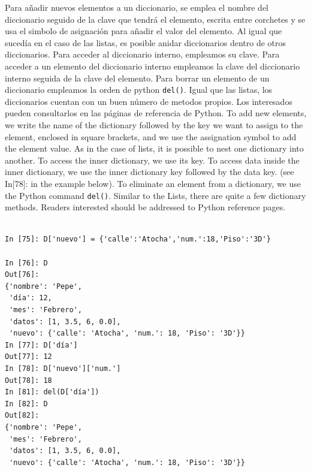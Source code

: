 \begin{paracol}{2}
Para añadir nuevos elementos a un diccionario, se emplea el nombre del diccionario seguido de la clave que tendrá el elemento, escrita entre corchetes y se usa el simbolo de asignación para añadir el valor del elemento. Al igual que sucedía en el caso de las listas, es posible anidar diccionarios dentro de otros diccionarios. Para acceder al diccionario interno, empleamos su clave. Para acceder a un elemento del diccionario interno empleamos la clave del diccionario interno seguida de la clave del elemento. Para borrar un elemento de un diccionario empleamos la orden de python \texttt{del()}. Igual que las listas, los diccionarios cuentan con un buen número de metodos propios. Los interesados pueden consultarlos en las páginas de referencia de Python.
\switchcolumn
To add new elements, we write the name of the dictionary followed by the key we want to assign to the element, enclosed in square brackets, and we use the assignation symbol to add the element value. As in the case of lists, it is possible to nest one dictionary into another. To access the inner dictionary, we use its key. To access data inside the inner dictionary, we use the inner dictionary key followed by the data key. (see In[78]: in the example below). To eliminate an element from a dictionary, we use the Python command \texttt{del()}. Similar to the Lists, there are quite a few dictionary methods. Readers interested should be addressed to Python reference pages.
\end{paracol}

\begin{verbatim}

In [75]: D['nuevo'] = {'calle':'Atocha','num.':18,'Piso':'3D'}

In [76]: D
Out[76]: 
{'nombre': 'Pepe',
 'día': 12,
 'mes': 'Febrero',
 'datos': [1, 3.5, 6, 0.0],
 'nuevo': {'calle': 'Atocha', 'num.': 18, 'Piso': '3D'}}
In [77]: D['día']
Out[77]: 12
In [78]: D['nuevo']['num.']
Out[78]: 18
In [81]: del(D['día'])
In [82]: D
Out[82]: 
{'nombre': 'Pepe',
 'mes': 'Febrero',
 'datos': [1, 3.5, 6, 0.0],
 'nuevo': {'calle': 'Atocha', 'num.': 18, 'Piso': '3D'}}
\end{verbatim}


